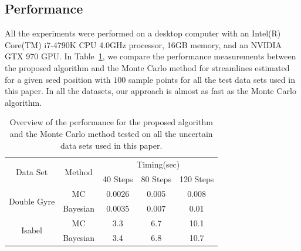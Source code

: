 \subsection{Performance}

All the experiments were performed on a desktop computer with an Intel(R) Core(TM) i7-4790K CPU 4.0GHz processor, 16GB memory, and an NVIDIA GTX 970 GPU. In Table~\ref{timing}, we compare the performance measurements between the proposed algorithm and the Monte Carlo method for streamlines estimated for a given seed position with $100$ sample points for all the test data sets used in this paper. In all the datasets, our approach is almost as fast as the Monte Carlo algorithm.

\begin{table}[!htb]
\centering
\begin{tabular}{|c|c|c|c|c|}
\hline
\multirow{2}{*}{Data Set}    & \multirow{2}{*}{Method}     & \multicolumn{3}{c|}{Timing(sec)}  \\ \cline{3-5}
                             &                             & 40 Steps  & 80 Steps & 120 Steps  \\ \hline
\multirow{2}{*}{Double Gyre} & MC                          & 0.0026    & 0.005    & 0.008      \\ \cline{2-5}
                             & Bayesian             & 0.0035    & 0.007    & 0.01       \\ \hline
\multirow{2}{*}{Isabel}      & MC                          & 3.3       & 6.7      & 10.1       \\ \cline{2-5}
                             & Bayesian             & 3.4       & 6.8      & 10.7       \\ \hline

\end{tabular}
\caption{Overview of the performance for the proposed algorithm and the Monte Carlo method tested on all the uncertain data sets used in this paper.}
\label{timing}
\end{table}
